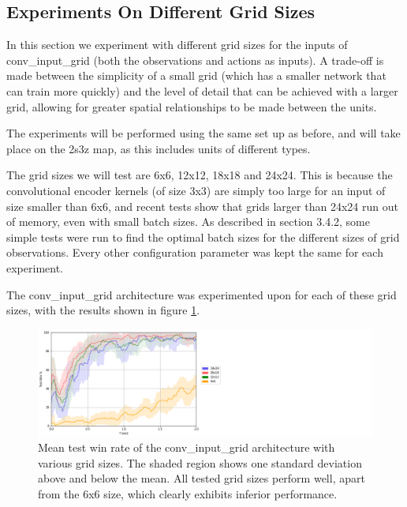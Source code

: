 \subsection{Experiments On Different Grid Sizes}
In this section we experiment with different grid sizes for the inputs of conv\_input\_grid (both the observations and actions as inputs). A trade-off is made between the simplicity of a small grid (which has a smaller network that can train more quickly) and the level of detail that can be achieved with a larger grid, allowing for greater spatial relationships to be made between the units.

The experiments will be performed using the same set up as before, and will take place on the 2s3z map, as this includes units of different types.



The grid sizes we will test are 6x6, 12x12, 18x18 and 24x24. This is because the convolutional encoder kernels (of size 3x3) are simply too large for an input of size smaller than 6x6, and recent tests show that grids larger than 24x24 run out of memory, even with small batch sizes. As described in section 3.4.2, some simple tests were run to find the optimal batch sizes for the different sizes of grid observations. Every other configuration parameter was kept the same for each experiment.





The conv\_input\_grid architecture was experimented upon for each of these grid sizes, with the results shown in figure \ref{fig:gridsizes}.


\begin{figure}
    \centering
    \hbox{\hspace{5em}\includegraphics[scale=0.5]{images/graphs/grids.png}}
    \caption{Mean test win rate of the conv\_input\_grid architecture with various grid sizes. The shaded region shows one standard deviation above and below the mean. All tested grid sizes perform well, apart from the 6x6 size, which clearly exhibits inferior performance.}
    \label{fig:gridsizes}
\end{figure}

